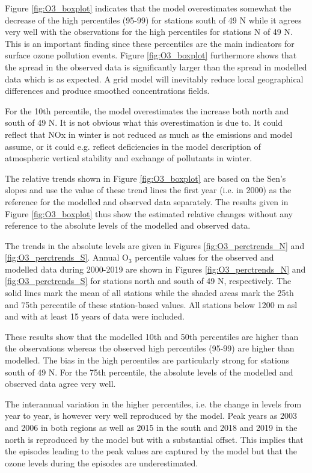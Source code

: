 Figure \ref{fig:O3_boxplot} indicates that the model overestimates somewhat the decrease of the high percentiles (95-99) for stations south of 49 \degrees N while it agrees very well with the observations for the high percentiles for stations N of 49 \degrees N. This is an important finding since these percentiles are the main indicators for surface ozone pollution events. Figure \ref{fig:O3_boxplot} furthermore shows that the spread in the observed data is significantly larger than the spread in modelled data which is as expected. A grid model will inevitably reduce local geographical differences and produce smoothed concentrations fields. 

For the 10th percentile, the model overestimates the increase both north and south of 49 \degrees N. It is not obvious what this overestimation is due to. It could reflect that NOx in winter is not reduced as much as the emissions and model assume, or it could e.g. reflect deficiencies in the model description of atmospheric vertical stability and exchange of pollutants in winter. 

The relative trends shown in Figure \ref{fig:O3_boxplot} are based on the Sen's slopes and use the value of these trend lines the first year (i.e. in 2000) as the reference for the modelled and observed data separately. The results given in Figure \ref{fig:O3_boxplot} thus show the estimated relative changes without any reference to the absolute levels of the modelled and observed data. 

The trends in the absolute levels are given in Figures \ref{fig:O3_perctrends_N} and \ref{fig:O3_perctrends_S}. Annual O$_3$ percentile values for the observed and modelled data during 2000-2019 are shown in Figures \ref{fig:O3_perctrends_N} and \ref{fig:O3_perctrends_S} for stations north and south of 49 \degrees N, respectively. The solid lines mark the mean of all stations while the shaded areas mark the 25th and 75th percentile of these station-based values. All stations below 1200 m asl and with at least 15 years of data were included. 

These results show that the modelled 10th and 50th percentiles are higher than the observations whereas the observed high percentiles (95-99) are higher than modelled. The bias in the high percentiles are particularly strong for stations south of 49 \degrees N. For the 75th percentile, the absolute levels of the modelled and observed data agree very well. 

The interannual variation in the higher percentiles, i.e. the change in levels from year to year, is however very well reproduced by the model. Peak years as 2003 and 2006 in both regions as well as 2015 in the south and 2018 and 2019 in the north is reproduced by the model but with a substantial offset. This implies that the episodes leading to the peak values are captured by the model but that the ozone levels during the episodes are underestimated. 

